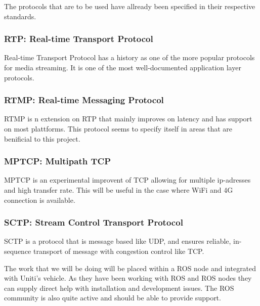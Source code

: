 \documentclass[a4paper]{article}
\begin{document}
The protocols that are to be used have allready been specified in their
respective standards.

\subsubsection*{RTP: Real-time Transport Protocol}	
Real-time Transport Protocol has a history as one of the more popular protocols
for media streaming. It is one of the most well-documented application layer
protocols. \cite{spec_RTP}

\subsubsection*{RTMP: Real-time Messaging Protocol}
RTMP is n extension on RTP that mainly improves on latency and has support on
most plattforms. This protocol seems to specify itself in areas that are
benificial to this project. \cite{spec_RTMP}

\subsubsection*{MPTCP: Multipath TCP}
MPTCP is an experimental improvent of TCP allowing for multiple ip-adresses and
high transfer rate. This will be useful in the case where	WiFi and 4G connection
is available. \cite{spec_MPTCP}

\subsubsection*{SCTP: Stream Control Transport Protocol}
SCTP is a protocol that is message based like UDP, and ensures reliable,
in-sequence transport of message with congestion control like TCP.
\cite{spec_SCTP}

The work that we will be doing will be placed within a ROS node and integrated
with Uniti's vehicle. As they have been working with ROS and ROS nodes they can
supply direct help with installation and development issues. The ROS community
is also quite active and should be able to provide support.



\end{document}
